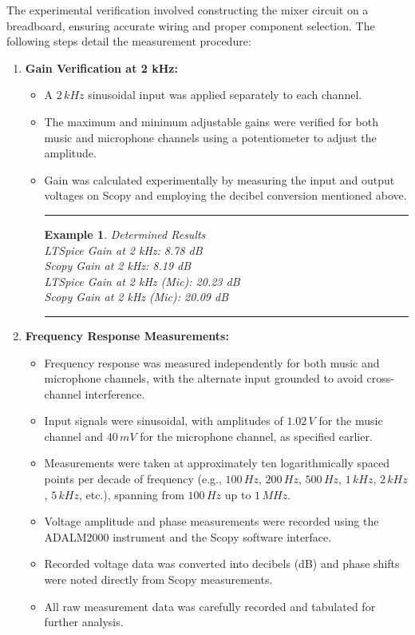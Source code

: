 \documentclass[12pt]{article}
\newtheorem{example}{Example}
\newenvironment{examp}
{\vspace{0.5cm}
 \hrule
\vspace{0.5cm}
\begin{example}}
{\hrule
\vspace{0.5cm}
\end{example}}
\begin{document}
The experimental verification involved constructing the mixer circuit on a breadboard, ensuring accurate wiring and proper component selection. The following steps detail the measurement procedure:

\begin{enumerate}
	\item \textbf{Gain Verification at 2 kHz:}
	      \begin{itemize}
		      \item A $2\,kHz$ sinusoidal input was applied separately to each channel.
		      \item The maximum and minimum adjustable gains were verified for both music and microphone channels using a potentiometer to adjust the amplitude.
		      \item Gain was calculated experimentally by measuring the input and
		            output voltages on Scopy and employing the decibel conversion
		            mentioned above.\\
		            \begin{examp}
			            Determined Results\\
			            LTSpice Gain at 2 kHz: 8.78 dB\\
			            Scopy Gain at 2 kHz: 8.19 dB\\
			            LTSpice Gain at 2 kHz (Mic): 20.23 dB\\
			            Scopy Gain at 2 kHz (Mic): 20.09 dB\\
		            \end{examp}
	      \end{itemize}

	\item \textbf{Frequency Response Measurements:}
	      \begin{itemize}
		      \item Frequency response was measured independently for both music and microphone channels, with the alternate input grounded to avoid cross-channel interference.
		      \item Input signals were sinusoidal, with amplitudes of $1.02\,V$ for the music channel and $40\,mV$ for the microphone channel, as specified earlier.
		      \item Measurements were taken at approximately ten logarithmically spaced points per decade of frequency (e.g., $100\,Hz$, $200\,Hz$, $500\,Hz$, $1\,kHz$, $2\,kHz$, $5\,kHz$, etc.), spanning from $100\,Hz$ up to $1\,MHz$.
		      \item Voltage amplitude and phase measurements were recorded using the ADALM2000 instrument and the Scopy software interface.
		      \item Recorded voltage data was converted into decibels (dB) and phase shifts were noted directly from Scopy measurements.
		      \item All raw measurement data was carefully recorded and tabulated for further analysis.
	      \end{itemize}
\end{enumerate}
\end{document}
